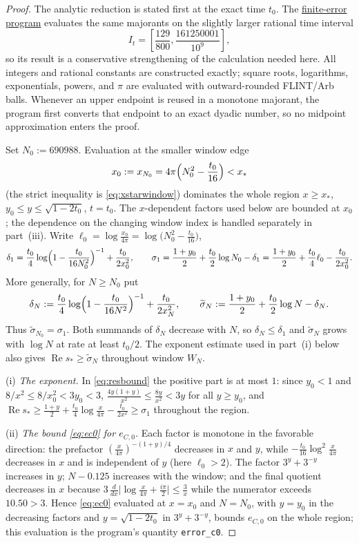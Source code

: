 \documentclass[11pt]{article}
\theoremstyle{definition}
\newcommand{\programlink}[2]{\href{https://github.com/judegomila/dbn-lambda-01787854-candidate-audit/blob/6222740efae58d773a70ff929cf12a34932d2af0/#1}{#2}}
\DeclareMathOperator{\Rea}{Re}
\begin{document}
\begin{proof}
The analytic reduction is stated first at the exact time $t_0$.  The
\programlink{verifiers/verify_prop410_arb.c}{finite-error program} evaluates
the same majorants on the slightly larger rational time interval
\[
I_t=\left[\frac{129}{800},\frac{161250001}{10^9}\right],
\]
so its result is a conservative strengthening of the calculation needed here.
All integers and rational constants are constructed exactly; square roots,
logarithms, exponentials, powers, and $\pi$ are evaluated with
outward-rounded FLINT/Arb balls.  Whenever an upper endpoint is reused in a
monotone majorant, the program first converts that endpoint to an exact dyadic
number, so no midpoint approximation enters the proof.

Set $N_0:=690988$.  Evaluation at the smaller window edge
\[
x_0:=x_{N_0}=4\pi\Bigl(N_0^2-\frac{t_0}{16}\Bigr)<x_*
\]
(the strict inequality is \eqref{eq:xstarwindow}) dominates the whole region
$x\ge x_*$, $y_0\le y\le\sqrt{1-2t_0}$, $t=t_0$.  The
$x$-dependent factors used below are bounded at $x_0$; the dependence on the
changing window index is handled separately in part~(iii).
Write
$\ell_0=\log\frac{x_0}{4\pi}
=\log\bigl(N_0^2-\tfrac{t_0}{16}\bigr)$,
\[
\delta_1=\frac{t_0}4\log\Bigl(1-\frac{t_0}{16N_0^2}\Bigr)^{-1}
+\frac{t_0}{2x_0^2},
\qquad
\sigma_1=\frac{1+y_0}2+\frac{t_0}2\log N_0-\delta_1
=\frac{1+y_0}2+\frac{t_0}4\ell_0-\frac{t_0}{2x_0^2}.
\]
More generally, for $N\ge N_0$ put
\[
\delta_N:=\frac{t_0}4\log\Bigl(1-\frac{t_0}{16N^2}\Bigr)^{-1}
 +\frac{t_0}{2x_N^2},
\qquad
\widetilde\sigma_N:=\frac{1+y_0}2+\frac{t_0}2\log N-\delta_N.
\]
Thus $\widetilde\sigma_{N_0}=\sigma_1$. Both summands of
$\delta_N$ decrease with $N$, so $\delta_N\le\delta_1$ and
$\widetilde\sigma_N$ grows with $\log N$ at rate at least $t_0/2$.
The exponent estimate used in part~(i) below also gives
$\Rea s_*\ge\widetilde\sigma_N$ throughout window $W_N$.

(i) \emph{The exponent.} In \eqref{eq:resbound} the positive part
is at most $1$: since $y_0<1$ and
$8/x^2\le 8/x_0^2<3y_0<3$,
$\frac{4y(1+y)}{x^2}\le\frac{8y}{x^2}<3y$ for all $y\ge y_0$, and
$\Rea s_*\ge\frac{1+y}2+\frac{t_0}4\log\frac x{4\pi}
-\frac{t_0}{2x^2}\ge\sigma_1$ throughout the region.

(ii) \emph{The bound \eqref{eq:ec0} for $e_{C,0}$.} Each factor is
monotone in the favorable direction: the prefactor
$(\frac x{4\pi})^{-(1+y)/4}$ decreases in $x$ and $y$, while
$-\frac{t_0}{16}\log^2\frac x{4\pi}$ decreases in $x$ and is independent
of $y$ (here $\ell_0>2$).  The factor $3^y+3^{-y}$ increases in $y$;
$N-0.125$ increases with the window; and the final quotient
decreases in $x$ because
$3\,\frac{d}{dx}\bigl|\log\tfrac x{4\pi}+\tfrac{i\pi}2\bigr|
\le\frac3x$ while the numerator exceeds $10.50>3$.
Hence \eqref{eq:ec0} evaluated at $x=x_0$ and $N=N_0$, with $y=y_0$
in the decreasing factors and $y=\sqrt{1-2t_0}$ in $3^y+3^{-y}$,
bounds $e_{C,0}$ on the whole region; this evaluation is the
program's quantity \texttt{error\_c0}.


\end{proof}
\end{document}
